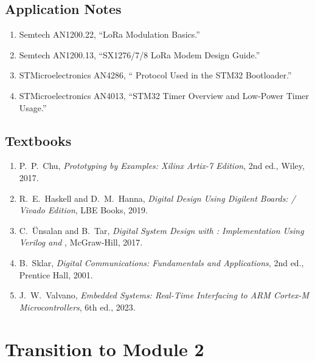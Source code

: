 \documentclass[11pt,letterpaper]{article}
\begin{document}
	\subsection{Application Notes}
	
	\begin{enumerate}[leftmargin=2em]
		\item Semtech AN1200.22, ``LoRa Modulation Basics.''
		\item Semtech AN1200.13, ``SX1276/7/8 LoRa Modem Design Guide.''
		\item STMicroelectronics AN4286, ``\SPI{} Protocol Used in the STM32 Bootloader.''
		\item STMicroelectronics AN4013, ``STM32 Timer Overview and Low-Power Timer Usage.''
	\end{enumerate}
	
	\subsection{Textbooks}
	
	\begin{enumerate}[leftmargin=2em]
		\item P.\ P.\ Chu, \textit{\FPGA{} Prototyping by \VHDL{} Examples: Xilinx Artix-7 Edition}, 2nd ed., Wiley, 2017.
		\item R.\ E.\ Haskell and D.\ M.\ Hanna, \textit{Digital Design Using Digilent \FPGA{} Boards: \VHDL{} / Vivado Edition}, LBE Books, 2019.
		\item C.\ \"Unsalan and B.\ Tar, \textit{Digital System Design with \FPGA{}: Implementation Using Verilog and \VHDL{}}, McGraw-Hill, 2017.
		\item B.\ Sklar, \textit{Digital Communications: Fundamentals and Applications}, 2nd ed., Prentice Hall, 2001.
		\item J.\ W.\ Valvano, \textit{Embedded Systems: Real-Time Interfacing to ARM Cortex-M Microcontrollers}, 6th ed., 2023.
	\end{enumerate}
	
	\newpage
	\section{Transition to Module 2}
	
\end{document}
